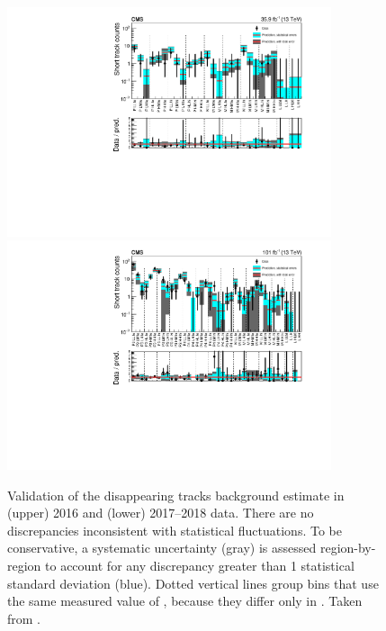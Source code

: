     \begin{figure}[h!]
      \centering
      \includegraphics[width=0.85\textwidth]{figures/MT2_2019/Figure_004-a.pdf}
      \includegraphics[width=0.85\textwidth]{figures/MT2_2019/Figure_004-b.pdf}
      \caption[Validation of the disappearing tracks background estimate in (upper) 2016 and (lower) 2017--2018 data.]
              {Validation of the disappearing tracks background estimate in (upper) 2016 and (lower) 2017--2018 data.
                There are no discrepancies inconsistent with statistical fluctuations.
                To be conservative, a systematic uncertainty (gray) is assessed region-by-region to account for any discrepancy greater than 1 statistical standard deviation (blue).
                Dotted vertical lines group bins that use the same measured value of \fshort, because they differ only in \Ht.
                Taken from \cite{MT2_2019}.}
      \label{fig:distracksval}
    \end{figure}  

